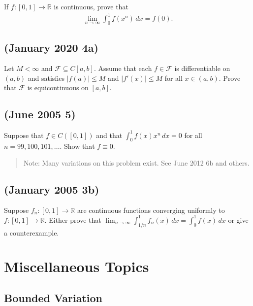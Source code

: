 If \(f:[0,1]\to\mathbb{R}\) is continuous, prove that
\begin{align*}\displaystyle\lim_{n\to\infty}\int_0^1 f(x^n)\,dx=f(0).\end{align*}

\hypertarget{january-2020-4a}{%
\subsection{(January 2020 4a)}\label{january-2020-4a}}

Let \(M<\infty\) and \(\mathcal{F} \subseteq C[a,b]\). Assume that each
\(f \in \mathcal{F}\) is differentiable on \((a,b)\) and satisfies
\(|f(a)| \leq M\) and \(|f'(x)| \leq M\) for all \(x \in (a,b)\). Prove
that \(\mathcal{F}\) is equicontinuous on \([a,b]\).

\hypertarget{june-2005-5}{%
\subsection{(June 2005 5)}\label{june-2005-5}}

Suppose that \(f\in C([0,1])\) and that
\(\displaystyle \int_0^1 f(x)x^n\,dx=0\) for all
\(n=99,100,101,\ldots\). Show that \(f\equiv 0\).\\

\begin{quote}
Note: Many variations on this problem exist. See June 2012 6b and
others.
\end{quote}

\hypertarget{january-2005-3b}{%
\subsection{(January 2005 3b)}\label{january-2005-3b}}

Suppose \(f_n:[0,1]\to\mathbb{R}\) are continuous functions converging
uniformly to \(f:[0,1]\to\mathbb{R}\). Either prove that
\(\displaystyle\lim_{n\to\infty}\int_{1/n}^1 f_n(x)\,dx=\int_0^1 f(x)\,dx\)
or give a counterexample.

\hypertarget{miscellaneous-topics}{%
\section{Miscellaneous Topics}\label{miscellaneous-topics}}

\hypertarget{bounded-variation}{%
\subsection*{Bounded Variation}\label{bounded-variation}}

